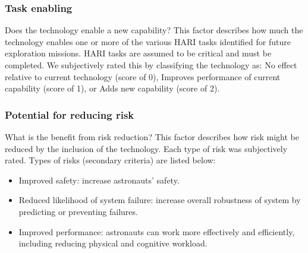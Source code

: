 
\subsubsection{Task enabling}
Does the technology enable a new capability? This factor describes how much the technology enables one or more of the various HARI tasks identified for future exploration missions.
HARI tasks are assumed to be critical and must be completed.
We subjectively rated this by classifying the technology as: No effect relative to current technology (score of 0), Improves performance of current capability (score of 1), or Adds new capability (score of 2).

\subsubsection{Potential for reducing risk}
What is the benefit from risk reduction? This factor describes how risk might be reduced by the inclusion of the technology.
Each type of risk was subjectively rated.
Types of risks (secondary criteria) are listed below:
\begin{itemize}
    \item Improved safety: increase astronauts' safety.
    \item Reduced likelihood of system failure: increase overall robustness of system by predicting or preventing failures.
    \item Improved performance: astronauts can work more effectively and efficiently, including reducing physical and cognitive workload.
\end{itemize}

